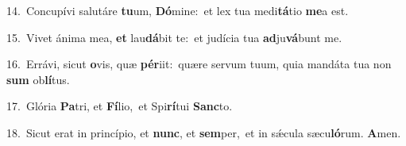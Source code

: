 {\numbfont\textcolor{\numbcolor}{14.}}~Concupívi salutáre \textbf{tu}\-um, \textbf{Dó}\-mine:~\star et lex tua medi\-\textbf{tá}\-tio \textbf{me}\-a est.\par
{\numbfont\textcolor{\numbcolor}{15.}}~Vivet ánima mea, \textbf{et} lau\-\textbf{dá}\-bit te:~\star et judícia tua \textbf{ad}\-ju\-\textbf{vá}\-bunt me.\par
{\numbfont\textcolor{\numbcolor}{16.}}~Errávi, sicut \textbf{o}\-vis, quæ \textbf{pér}\-iit:~\star quære servum tuum, quia mandáta tua non \textbf{sum} ob\-\textbf{lí}\-tus.\par
{\numbfont\textcolor{\numbcolor}{17.}}~Glória \textbf{Pa}\-tri, et \textbf{Fí}\-lio,~\star et Spi\-\textbf{rí}\-tui \textbf{Sanc}\-to.\par
{\numbfont\textcolor{\numbcolor}{18.}}~Sicut erat in princípio, et \textbf{nunc}\-, et \textbf{sem}\-per,~\star et in sǽcula sæcu\-\textbf{ló}\-rum. \textbf{A}\-men.\par
